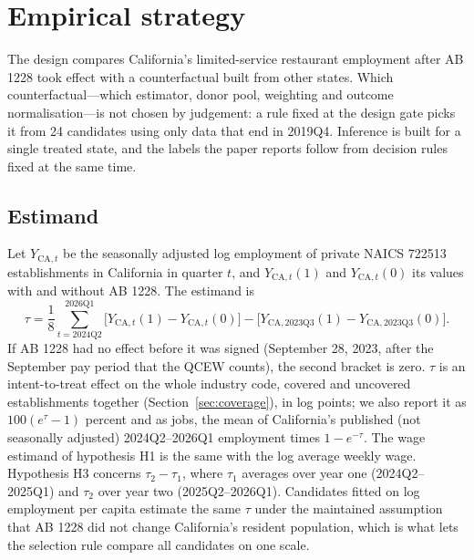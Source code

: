 \section{Empirical strategy}
\label{sec:strategy}

The design compares California's limited-service restaurant employment after AB 1228 took effect
with a counterfactual built from other states. Which counterfactual---which estimator, donor pool,
weighting and outcome normalisation---is not chosen by judgement: a rule fixed at the design gate
picks it from 24 candidates using only data that end in 2019Q4. Inference is built for a single
treated state, and the labels the paper reports follow from decision rules fixed at the same time.

\subsection{Estimand}
\label{sec:estimand}

Let $Y_{\mathrm{CA},t}$ be the seasonally adjusted log employment of private NAICS 722513
establishments in California in quarter $t$, and $Y_{\mathrm{CA},t}(1)$ and $Y_{\mathrm{CA},t}(0)$
its values with and without AB 1228. The estimand is
\begin{equation}
\label{eq:estimand}
\tau = \frac{1}{8}\sum_{t=\text{2024Q2}}^{\text{2026Q1}}
  \bigl[Y_{\mathrm{CA},t}(1) - Y_{\mathrm{CA},t}(0)\bigr]
  - \bigl[Y_{\mathrm{CA},\text{2023Q3}}(1) - Y_{\mathrm{CA},\text{2023Q3}}(0)\bigr].
\end{equation}
If AB 1228 had no effect before it was signed (September 28, 2023, after the September pay period
that the QCEW counts), the second bracket is zero. $\tau$ is an intent-to-treat effect on the whole
industry code, covered and uncovered establishments together (Section~\ref{sec:coverage}), in log
points; we also report it as $100(e^{\tau}-1)$ percent and as jobs, the mean of California's
published (not seasonally adjusted) 2024Q2--2026Q1 employment times $1 - e^{-\tau}$. The wage
estimand of hypothesis H1 is the same with the log average weekly wage. Hypothesis H3 concerns
$\tau_2 - \tau_1$, where $\tau_1$ averages over year one (2024Q2--2025Q1) and $\tau_2$ over year two
(2025Q2--2026Q1). Candidates fitted on log employment per capita estimate the same $\tau$ under the
maintained assumption that AB 1228 did not change California's resident population, which is what
lets the selection rule compare all candidates on one scale.

